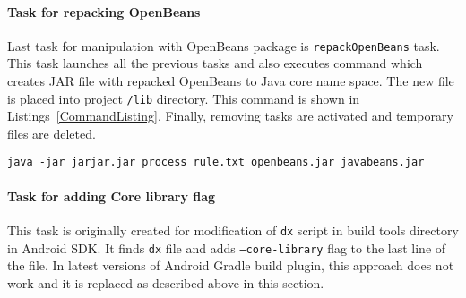 \paragraph{Task for repacking OpenBeans}
Last task for manipulation with OpenBeans package is \texttt{repackOpenBeans} task. This task launches all the previous
tasks and also executes command which creates JAR file with repacked OpenBeans to Java core name space. The new file is
placed into project \texttt{/lib} directory. This command is shown in Listings~\ref{CommandListing}. Finally,
removing tasks are activated and temporary files are deleted.
\\
\begin{lstlisting}[captionpos={b},caption={Command for repacking \texttt{openbeans.jar} file.},frame={lines},
label={CommandListing},basicstyle=\footnotesize]
java -jar jarjar.jar process rule.txt openbeans.jar javabeans.jar
\end{lstlisting}

\paragraph{Task for adding Core library flag}
This task is originally created for modification of \texttt{dx} script in build tools directory in Android SDK. It finds
\texttt{dx} file and adds \texttt{--core-library} flag to the last line of the file. In latest versions of Android
Gradle build plugin, this approach does not work and it is replaced as described above in this section.
